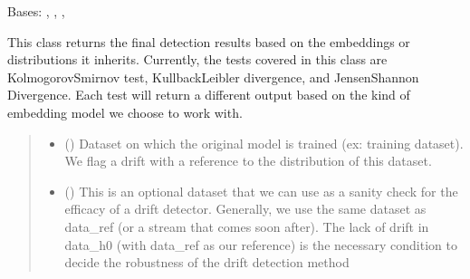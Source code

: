 \documentclass[letterpaper,10pt,english]{sphinxmanual}
\begin{document}
\begin{fulllineitems}
\label{\detokenize{fldModules/myDetectors:myDetectors.myDetectors}}
\pysigstartsignatures
{}
\pysigstopsignatures
\sphinxAtStartPar
Bases: {\hyperref[\detokenize{fldModules/distributions:distributions.distributions}]{}}, {\hyperref[\detokenize{fldModules/embedding:embedding.embedding}]{}}, {\hyperref[\detokenize{baseModules/sampling:sampling.samplingData}]{}}, {\hyperref[\detokenize{baseModules/base:base.detectorParent}]{}}

\begin{fulllineitems}
\label{\detokenize{fldModules/myDetectors:myDetectors.myDetectors.__init__}}
\pysigstartsignatures
{}
\pysigstopsignatures
\sphinxAtStartPar
This class returns the final detection results based on the embeddings or distributions it
inherits. Currently, the tests covered in this class are Kolmogorov\textendash{}Smirnov test,
Kullback\textendash{}Leibler divergence, and Jensen\sphinxhyphen{}Shannon Divergence. Each test will return a different
output based on the kind of embedding model we choose to work with.
\begin{quote}\begin{description}
\begin{itemize}
\item {} 
\sphinxAtStartPar
{} (\sphinxstyleliteralemphasis{\sphinxupquote{, }}) \textendash{} Dataset on which the original model is trained (ex: training dataset). We flag a drift
with a reference to the distribution of this dataset.

\item {} 
\sphinxAtStartPar
{} (\sphinxstyleliteralemphasis{\sphinxupquote{, }}) \textendash{} This is an optional dataset that we can use as a sanity check for the efficacy of a drift
detector. Generally, we use the same dataset as data\_ref (or a stream that comes soon after).
The lack of drift in data\_h0 (with data\_ref as our reference) is the necessary
condition to decide the robustness of the drift detection method


\end{itemize}
\end{description}
\end{quote}
\end{fulllineitems}
\end{fulllineitems}
\end{document}
